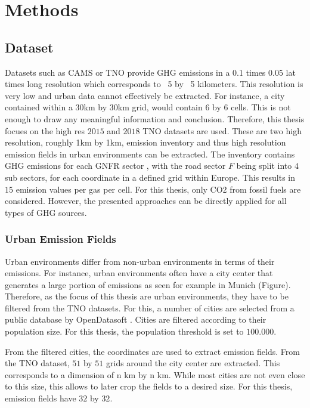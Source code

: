 
\chapter{Methods}\label{chapter:methods}

\section{Dataset}
Datasets such as CAMS \parencite{CAMS} or TNO \parencite{TNO_LowRes}  provide GHG emissions in a 0.1 times 0.05 lat times long resolution which corresponds to ~5 by ~5 kilometers.
This resolution is very low and urban data cannot effectively be extracted.
For instance, a city contained within a 30km by 30km grid, would contain 6 by 6 cells.
This is not enough to draw any meaningful information and conclusion. 
Therefore, this thesis focues on the high res $2015$ \parencite{TNO_HighRes15} and $2018$ \parencite{TNO_HighRes18} TNO datasets are used.
These are two high resolution, roughly 1km by 1km, emission inventory and thus high resolution emission fields in urban environments can be extracted.
The inventory contains GHG emissions for each GNFR sector \parencite{GNFR_Sectors}, with the road sector $F$ being split into $4$ sub sectors, for each coordinate in a defined grid within Europe.
This results in $15$ emission values per gas per cell.
For this thesis, only CO2 from fossil fuels are considered.
However, the presented approaches can be directly applied for all types of GHG sources.

\subsection{Urban Emission Fields}
Urban environments differ from non-urban environments in terms of their emissions.
For instance, urban environments often have a city center that generates a large portion of emissions as seen for example in Munich (Figure).
Therefore, as the focus of this thesis are urban environments, they have to be filtered from the TNO datasets.
For this, a number of cities are selected from a public database by OpenDatasoft \parencite{OpenDataSoft}.
Cities are filtered according to their population size.
For this thesis, the population threshold is set to $100.000$.

From the filtered cities, the coordinates are used to extract emission fields.
From the TNO dataset, $51$ by $51$ grids around the city center are extracted.
This corresponds to a dimension of n km by n km.
While most cities are not even close to this size, this allows to later crop the fields to a desired size.
For this thesis, emission fields have $32$ by $32$.

